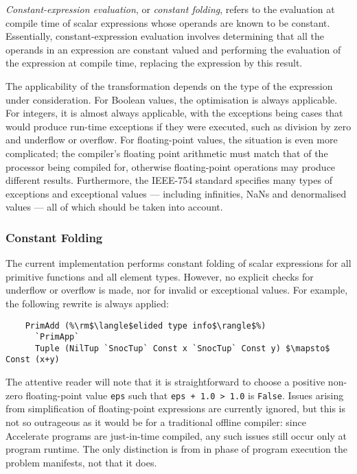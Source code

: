 \emph{Constant-expression evaluation}, or \emph{constant folding}, refers to the
evaluation at compile time of scalar expressions whose operands are known to be
constant. Essentially, constant-expression evaluation involves determining that
all the operands in an expression are constant valued and performing the
evaluation of the expression at compile time, replacing the expression by this
result.

The applicability of the transformation depends on the type of the expression
under consideration. For Boolean values, the optimisation is always applicable.
For integers, it is almost always applicable, with the exceptions being cases
that would produce run-time exceptions if they were executed, such as division
by zero and underflow or overflow. For floating-point values, the situation is
even more complicated; the compiler's floating point arithmetic must match that
of the processor being compiled for, otherwise floating-point operations may
produce different results. Furthermore, the IEEE-754 standard specifies many
types of exceptions and exceptional values --- including infinities, NaNs and
denormalised values --- all of which should be taken into account.


\subsubsection{Constant Folding}

The current implementation performs constant folding of scalar expressions for
all primitive functions and all element types. However, no explicit checks for
underflow or overflow is made, nor for invalid or exceptional values. For
example, the following rewrite is always applied:
%
%
\begin{lstlisting}[style=Haskell,numbers=none,mathescape]
%\bf$\langle$ constant folding $\rangle$%
    PrimAdd (%\rm$\langle$elided type info$\rangle$%)
      `PrimApp`
      Tuple (NilTup `SnocTup` Const x `SnocTup` Const y) $\mapsto$ Const (x+y)
\end{lstlisting}
%
The attentive reader will note that it is straightforward to choose a positive
non-zero floating-point value \texttt{eps} such that \lstinline{eps + 1.0 > 1.0}
is \texttt{False}. Issues arising from simplification of floating-point
expressions are currently ignored, but this is not so outrageous as it would be
for a traditional offline compiler: since Accelerate programs are just-in-time
compiled, any such issues still occur only at program runtime. The only
distinction is from in phase of program execution the problem manifests, not
that it does.

